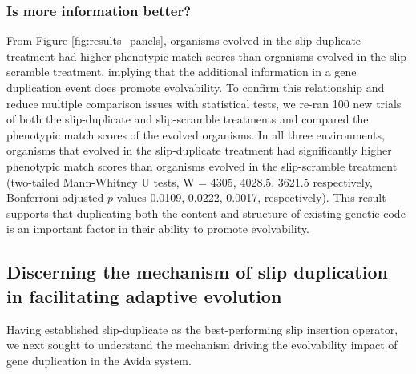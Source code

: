 \subsubsection{Is more information better?}
From Figure \ref{fig:results_panels}, organisms evolved in the slip-duplicate treatment had higher phenotypic match scores than organisms evolved in the slip-scramble treatment, implying that the additional information in a gene duplication event %
does
promote evolvability. To confirm this relationship and reduce multiple comparison issues with statistical tests, we re-ran 100 new trials of both the slip-duplicate and slip-scramble treatments %
and compared the phenotypic match scores of the evolved organisms. In all three environments, organisms that evolved in the slip-duplicate treatment had significantly higher phenotypic match scores than organisms evolved in the slip-scramble treatment (two-tailed Mann-Whitney U tests, W = 4305, 4028.5, 3621.5 respectively, Bonferroni-adjusted $p$ values 0.0109, 0.0222, 0.0017, respectively). This result supports that %
duplicating both the content and structure of existing genetic code is an important factor in their ability to promote evolvability.

\subsection{Discerning the mechanism of slip duplication in facilitating adaptive evolution}

Having established slip-duplicate as the best-performing slip insertion operator, we next sought to understand the mechanism driving the evolvability impact of gene duplication in the Avida system.

